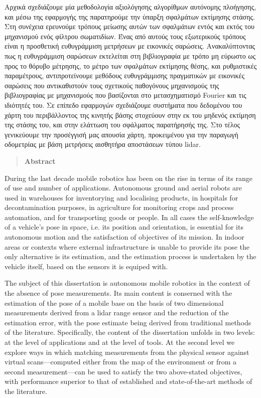Αρχικά σχεδιάζουμε μία μεθοδολογία αξιολόγησης αλγορίθμων αυτόνομης πλοήγησης,
και μέσω της εφαρμογής της παρατηρούμε την ύπαρξη σφαλμάτων εκτίμησης στάσης.
Στη συνέχεια ερευνούμε τρόπους μείωσης αυτών των σφαλμάτων εντός και εκτός του
μηχανισμού ενός φίλτρου σωματιδίων. Ένας από αυτούς τους εξωτερικούς τρόπους
είναι η προσθετική ευθυγράμμιση μετρήσεων με εικονικές σαρώσεις.
Ανακαλύπτοντας πως η ευθυγράμμιση σαρώσεων εκτελείται στη βιβλιογραφία με τρόπο
μη εύρωστο ως προς το θόρυβο μέτρησης, το μέτρο των σφαλμάτων εκτίμησης θέσης,
και ρυθμιστικές παραμέτρους, αντιπροτείνουμε μεθόδους ευθυγράμμισης πραγματικών
με εικονικές σαρώσεις που αντικαθιστούν τους σχετικούς παθογόνους μηχανισμούς
της βιβλιογραφίας με μηχανισμούς που βασίζονται στο μετασχηματισμό Fourier και
τις ιδιότητές του. Σε επίπεδο εφαρμογών σχεδιάζουμε συστήματα που δεδομένου
του χάρτη του περιβάλλοντος της κινητής βάσης στοχεύουν στην εκ του μηδενός
εκτίμηση της στάσης του, και στην ελάττωση του σφάλματος παρατήρησής της. Στο
τέλος γενικεύουμε την προσέγγισή μας απουσία χάρτη, προκειμένου για την
παραγωγή οδομετρίας με βάση μετρήσεις αισθητήρα αποστάσεων τύπου lidar.


\newpage

\begin{quotation}
\begin{center}
\textbf{Abstract}
\end{center}
\noindent
\end{quotation}

During the last decade mobile robotics has been on the rise in terms of its
range of use and number of applications. Autonomous ground and aerial robots
are used in warehouses for inventorying and localising products, in hospitals
for decontamination purposes, in agriculture for monitoring crops and process
automation, and for transporting goods or people. In all cases the
self-knowledge of a vehicle's pose in space, i.e. its position and orientation,
is essential for its autonomous motion and the satisfaction of objectives of
its mission. In indoor areas or contexts where external infrastructure is
unable to provide its pose the only alternative is its estimation, and the
estimation process is undertaken by the vehicle itself, based on the sensors it
is equiped with.

The subject of this dissertation is autonomous mobile robotics in the context
of the absence of pose measurements. Its main content is conserned with the
estimation of the pose of a mobile base on the basis of two dimensional
measurements derived from a lidar range sensor and the reduction of the
estimation error, with the pose estimate being derived from traditional methods
of the literature. Specifically, the content of the dissertation unfolds in two
levels: at the level of applications and at the level of tools. At the second
level we explore ways in which matching measurements from the physical sensor
against virtual scans---computed either from the map of the environment or from
a second measurement---can be used to satisfy the two above-stated objectives,
with performance superior to that of established and state-of-the-art methods
of the literature.

